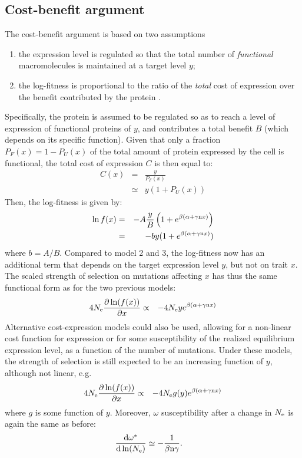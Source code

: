 \documentclass{article}
\begin{document}
\subsection{Cost-benefit argument}
The cost-benefit argument \citep{Beaulieu2018} is based on two assumptions 
\begin{enumerate}
 \item the expression level is regulated so that the total number of \emph{functional} macromolecules is maintained at a target level $y$;
 \item the log-fitness is proportional to the ratio of the \emph{total} cost of expression over the benefit contributed by the protein .
\end{enumerate}
Specifically, the protein is assumed to be regulated so as to reach a level of expression of functional proteins of $y$, and contributes a total benefit $B$ (which depends on its specific function). Given that only a fraction $P_{F}(x) = 1-P_{U}(x)$ of the total amount of protein expressed by the cell is functional, the total cost of expression $C$ is then equal to:
\begin{eqnarray}
C(x) &=& \frac{y}{P_{F}(x)}
\\ &\simeq& y (1 + P_{U}(x))
\end{eqnarray}
Then, the log-fitness is given by:
\begin{eqnarray}
\ln f (x) & = & -A \frac{y}{B} \left( 1 + e^{\beta(\alpha + \gamma\text{n} x)} \right)
\\
&=& -by (1 + e^{\beta(\alpha + \gamma\text{n} x)})
\end{eqnarray}
where $b = A /B$. Compared to model 2 and 3, the log-fitness now has an additional term that depends on the target expression level $y$, but not on trait $x$. The scaled strength of selection on mutations affecting $x$ has thus the same functional form as for the two previous models:
\begin{eqnarray}
4 N_{\mathrm{e}} \frac{\partial \ln (f(x))}{\partial x} &\propto& -4 N_{\mathrm{e}} y e^{\beta(\alpha + \gamma\text{n} x)}
\end{eqnarray}
Alternative cost-expression models could also be used, allowing for a non-linear cost function for expression or for some susceptibility of the realized equilibrium expression level, as a function of the number of mutations. Under these models, the strength of selection is still expected to be an increasing function of $y$, although not linear, e.g.
\begin{eqnarray}
4 N_{\mathrm{e}} \frac{\partial \ln (f(x))}{\partial x} &\propto& -4 N_{\mathrm{e}} g(y) e^{\beta(\alpha + \gamma\text{n} x)}
\end{eqnarray}
where $g$ is some function of $y$.
Moreover, $\omega$ susceptibility after a change in $N_{\mathrm{e}}$ is again the same as before:
\begin{align}
\frac{ \mathrm{d} \omega^{*}}{\mathrm{d} \ln (N_{\mathrm{e}})} & \simeq - \frac{1}{\beta \text{n} \gamma}.
\end{align}
\end{document}
